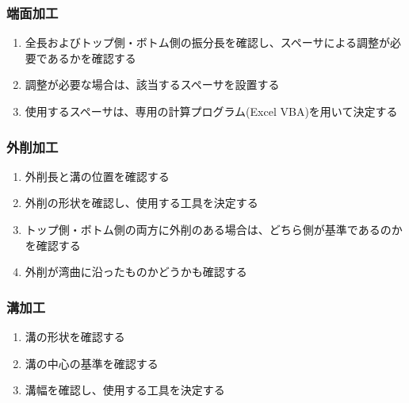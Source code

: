 \subsubsection{端面加工}
\begin{enumerate}
\item
{}全長およびトップ側・ボトム側の振分長を確認し、スペーサによる調整が必要であるかを確認する
\item 調整が必要な場合は、該当するスペーサを設置する
\item 使用するスペーサは、専用の計算プログラム(Excel VBA)を用いて決定する
\end{enumerate}

\subsubsection{外削加工}
\begin{enumerate}
\item {}外削長と溝の位置を確認する
\item 外削の形状を確認し、使用する工具を決定する
\item トップ側・ボトム側の両方に外削のある場合は、どちら側が基準であるのかを確認する
\item {}外削が湾曲に沿ったものかどうかも確認する
\end{enumerate}

\subsubsection{溝加工}
\begin{enumerate}
\item 溝の形状を確認する
\item {}溝の中心の基準を確認する
\item {}溝幅を確認し、使用する工具を決定する
\end{enumerate}

